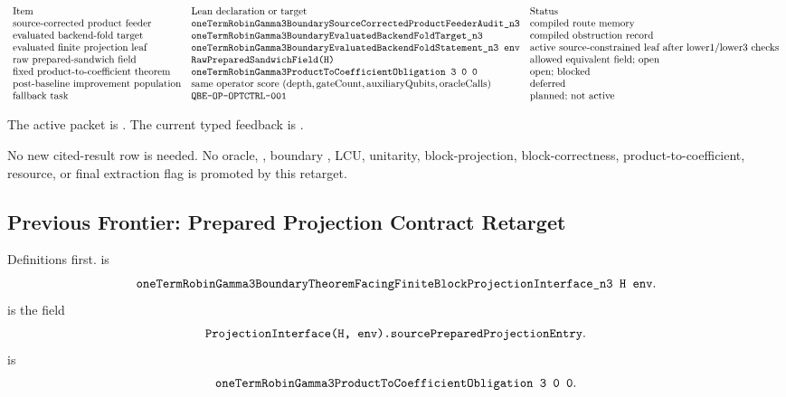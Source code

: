 \[
\begin{array}{lll}
\text{Item} & \text{Lean declaration or target} & \text{Status}\\
\text{source-corrected product feeder} &
\texttt{oneTermRobinGamma3BoundarySourceCorrectedProductFeederAudit\_n3} &
\text{compiled route memory}\\
\text{evaluated backend-fold target} &
\texttt{oneTermRobinGamma3BoundaryEvaluatedBackendFoldTarget\_n3} &
\text{compiled obstruction record}\\
\text{evaluated finite projection leaf} &
\texttt{oneTermRobinGamma3BoundaryEvaluatedBackendFoldStatement\_n3\ env} &
\text{active source-constrained leaf after lower1/lower3 checks}\\
\text{raw prepared-sandwich field} &
\texttt{RawPreparedSandwichField(H)} &
\text{allowed equivalent field; open}\\
\text{fixed product-to-coefficient theorem} &
\texttt{oneTermRobinGamma3ProductToCoefficientObligation\ 3\ 0\ 0} &
\text{open; blocked}\\
\text{post-baseline improvement population} &
\text{same operator score }(\text{depth},\text{gateCount},\text{auxiliaryQubits},\text{oracleCalls}) &
\text{deferred}\\
\text{fallback task} &
\texttt{QBE-OP-OPTCTRL-001} &
\text{planned; not active}
\end{array}
\]

The active packet is
.
The current typed feedback is
.

No new cited-result row is needed.  No oracle, , boundary
, LCU, unitarity, block-projection, block-correctness,
product-to-coefficient, resource, or final extraction flag is promoted by this
retarget.

\subsection{Previous Frontier: Prepared Projection Contract Retarget}

Definitions first.   is
\[
  \Lean{oneTermRobinGamma3BoundaryTheoremFacingFiniteBlockProjectionInterface\_n3\ H\ env}.
\]
 is the field
\[
  \texttt{ProjectionInterface(H, env).sourcePreparedProjectionEntry}.
\]
 is
\[
  \Lean{oneTermRobinGamma3ProductToCoefficientObligation\ 3\ 0\ 0}.
\]

